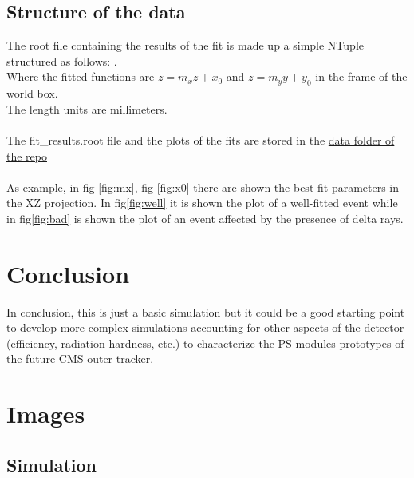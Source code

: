 \documentclass[10pt, a4paper, twocolumn]{article} %
\begin{document}
\subsection{Structure of the data}
The root file containing the results of the fit is made up a simple NTuple structured as follows:
.
\\
Where the fitted functions are $z=m_x z+x_0$ and $z=m_y y +y_0$ in the frame of the world box.\\
The length units are millimeters.
\\
\\
The fit\_results.root file and the plots of the fits are stored in the \href{https://github.com/pviscone/TrackG4/tree/main/data}{data folder of the repo}
\\
\\
As example, in fig \ref{fig:mx}, fig \ref{fig:x0} there are shown the best-fit parameters in the XZ projection.
In fig\ref{fig:well} it is shown the plot of a well-fitted event while in fig\ref{fig:bad} is shown the plot of an event affected by the presence of delta rays.
\section{Conclusion}
In conclusion, this is just a basic simulation but it could be a good starting point to develop more complex simulations accounting for other aspects of the detector (efficiency, radiation hardness, etc.) to characterize the PS modules prototypes of the future CMS outer tracker.

\printbibliography[title={Bibliography}] %

\onecolumn

\section*{Images}
\subsection*{Simulation}
\end{document}
